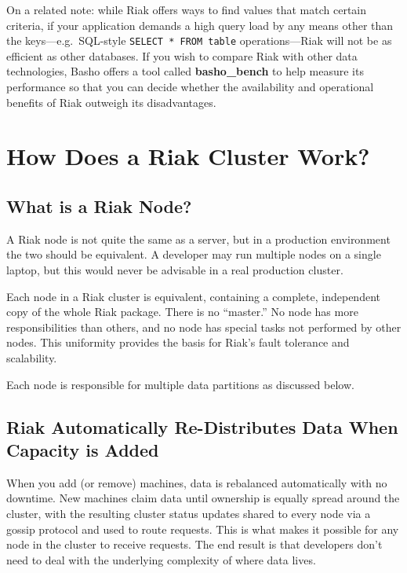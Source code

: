 \documentclass[letter]{book}
\newcounter{tab}[chapter]
\begin{document}
On a related note: while Riak offers ways to find values that match certain criteria, if your application demands a high query load by any means other than the keys---e.g.~SQL-style \texttt{SELECT * FROM table} operations---Riak will not be as efficient as other databases. If you wish to compare Riak with other data technologies, Basho offers a tool called \textbf{basho\_bench} to help measure its performance so that you can decide whether the availability and operational benefits of Riak outweigh its disadvantages.

\section{How Does a Riak Cluster Work?}\label{how-does-a-riak-cluster-work}

\subsection{What is a Riak Node?}\label{what-is-a-riak-node}

A Riak node is not quite the same as a server, but in a production environment the two should be equivalent. A developer may run multiple nodes on a single laptop, but this would never be advisable in a real production cluster.

Each node in a Riak cluster is equivalent, containing a complete, independent copy of the whole Riak package. There is no “master.” No node has more responsibilities than others, and no node has special tasks not performed by other nodes. This uniformity provides the basis for Riak's fault tolerance and scalability.

Each node is responsible for multiple data partitions as discussed below.

\subsection{Riak Automatically Re-Distributes Data When Capacity is Added}\label{riak-automatically-re-distributes-data-when-capacity-is-added}

When you add (or remove) machines, data is rebalanced automatically with no downtime. New machines claim data until ownership is equally spread around the cluster, with the resulting cluster status updates shared to every node via a gossip protocol and used to route requests. This is what makes it possible for any node in the cluster to receive requests. The end result is that developers don't need to deal with the underlying complexity of where data lives.
\end{document}

